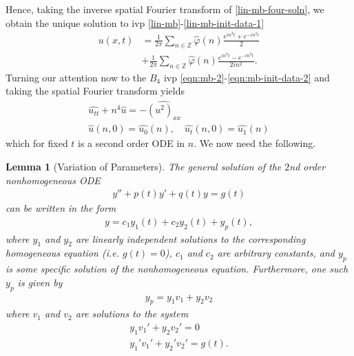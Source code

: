 \documentclass[12pt,reqno]{amsart}
\numberwithin{equation}{section}  %
\numberwithin{figure}{section}
\newcommand{\zz}{\mathbb{Z}}
\newcommand{\wh}{\widehat}
\newcommand{\vp}{\varphi}
\theoremstyle{plain}
\newtheorem{lemma}{Lemma}
\theoremstyle{definition}
\theoremstyle{remark}
\begin{document}
Hence, taking the inverse spatial Fourier transform of \eqref{lin-mb-four-soln},
we obtain the unique solution to ivp \eqref{lin-mb}-\eqref{lin-mb-init-data-1}
%
%
\begin{equation*}
\begin{split}
  u(x,t)
  & = \frac{1}{ 2 \pi}
  \sum_{n \in \zz}\wh{\vp}(n) \frac{e^{in^{2}t} + e^{-in^{2}t}}{2}
  \\
  & + \frac{1}{2 \pi} \sum_{n \in \zz}
  \wh{\vp}(n) \frac{e^{in^{2}t} - e^{-in^{2}t}}{2i n^{2}}.
\end{split}\end{equation*}
%
%
%
%
%
Turning our attention now to the $B_{4}$ ivp
\eqref{eqn:mb-2}-\eqref{eqn:mb-init-data-2} and taking the spatial Fourier
transform yields 
%
%
\begin{gather}
  \wh{u_{tt}} + n^{4} \wh{u} = -\wh{(u^{2})_{xx}}
  \label{four-trans-mb}
  \\
  \wh{u}(n, 0) = \wh{u_{0}}(n), \quad \wh{u_{t}}(n, 0) = \wh{u_{1}}(n)
  \label{four-trans-mb-data}
\end{gather}
which for fixed $t$ is a second order ODE in $n$. 
We now need the following.
%
%
%
%
%
%
%
%
\begin{lemma}[Variation of Parameters]
\label{lem:nonhomog-ode-soln}
The general solution of the $2$nd order nonhomogeneous ODE 
%
%
\begin{equation}
  \label{2nd-order-ode}
\begin{split}
y'' + p(t)y' + q(t)y = g(t)
\end{split}
\end{equation}
%
%
can be written in the form
%
%
\begin{equation*}
\begin{split}
  y = c_{1}y_{1}(t) + c_{2}y_{2}(t) + y_{p}(t),
\end{split}
\end{equation*}
%
%
where $y_{1}$ and $y_{2}$ are linearly independent solutions to the
corresponding homogeneous equation (i.e. $g(t) = 0$), $c_{1}$ and $c_{2}$ are
arbitrary constants, and $y_{p}$ is some specific solution of the nonhomogeneous
equation. Furthermore, one such $y_{p}$ is given by
%
%
\begin{equation}
  \label{2nd-order-ansatz}
\begin{split}
  y_{p} = y_{1}v_{1} + y_{2} v_{2}
\end{split}
\end{equation}
%
%
where $v_{1}$ and $v_{2}$ are solutions to the system
\begin{gather}
  \label{cancel-rel-1}
  y_{1} v_{1}' + y_{2} v_{2}' = 0
  \\
  \label{cancel-rel-2}
  y_{1}' v_{1}' + y_{2}' v_{2}' = g(t).
\end{gather}
\end{lemma}
\end{document}
